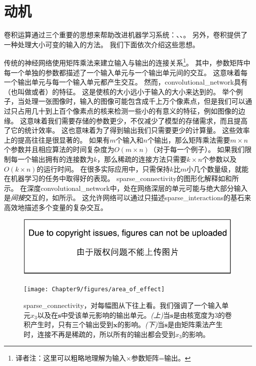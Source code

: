  
\section{动机}
\label{sec:motivation}

卷积运算通过三个重要的思想来帮助改进机器学习系统：、、。
另外，卷积提供了一种处理大小可变的输入的方法。
我们下面依次介绍这些思想。

传统的神经网络使用矩阵乘法来建立输入与输出的连接关系\footnote{译者注：这里可以粗略地理解为输入$\times$参数矩阵=输出。}。
其中，参数矩阵中每一个单独的参数都描述了一个输入单元与一个输出单元间的交互。
这意味着每一个输出单元与每一个输入单元都产生交互。
然而，\gls{convolutional_network}具有（也叫做或者）的特征。
这是使核的大小远小于输入的大小来达到的。
举个例子，当处理一张图像时，输入的图像可能包含成千上万个像素点，但是我们可以通过只占用几十到上百个像素点的核来检测一些小的有意义的特征，例如图像的边缘。
这意味着我们需要存储的参数更少，不仅减少了模型的存储需求，而且提高了它的统计效率。
这也意味着为了得到输出我们只需要更少的计算量。
这些效率上的提高往往是很显著的。
如果有$m$个输入和$n$个输出，那么矩阵乘法需要$m \times n$个参数并且相应算法的时间复杂度为$O(m\times n)$（对于每一个例子）。
如果我们限制每一个输出拥有的连接数为$k$，那么稀疏的连接方法只需要$k\times n$个参数以及$O(k\times n)$的运行时间。
在很多实际应用中，只需保持$k$比$m$小几个数量级，就能在机器学习的任务中取得好的表现。
\gls{sparse_connectivity}的图形化解释如和所示。
在深度\gls{convolutional_network}中，处在网络深层的单元可能与绝大部分输入是\emph{间接}交互的，如所示。
这允许网络可以通过只描述\gls{sparse_interactions}的基石来高效地描述多个变量的复杂交互。
\begin{figure}[!htb]
\ifOpenSource
\centerline{\includegraphics{figure.pdf}}
\else
\centerline{\texttt{[image: Chapter9/figures/area\_of\_effect]}}
\fi
\captionsetup{singlelinecheck=off}
\caption[Caption for LOF]{\gls{sparse_connectivity}，对每幅图从下往上看。我们强调了一个输入单元$x_3$以及在$\bm{s}$中受该单元影响的输出单元。\emph{(上)}当$\bm{s}$是由核宽度为3的卷积产生时，只有三个输出受到$\bm{x}$的影响\protect\footnotemark。\emph{(下)}当$\bm{s}$是由矩阵乘法产生时，连接不再是稀疏的，所以所有的输出都会受到$x_3$的影响。}
\label{fig:chap9_area_of_effect}
\end{figure}

